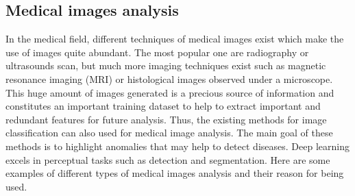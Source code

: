\documentclass[11pt, openany]{report}
\theoremstyle{plain}
\theoremstyle{definition}
\theoremstyle{remark}
\begin{document}
\subsection{Medical images analysis}
In the medical field, different techniques of medical images exist which make the use of images quite abundant. The most popular one are radiography or ultrasounds scan, but much more imaging techniques exist such as magnetic resonance imaging (MRI) or histological images observed under a microscope. This huge amount of images generated is a precious source of information and constitutes an important training dataset to help to extract important and redundant features for future analysis. Thus, the existing methods for image classification can also used for medical image analysis. The main goal of these methods is to highlight anomalies that may help to detect diseases. Deep learning excels in perceptual tasks such as detection and segmentation. Here are some examples of different types of medical images analysis and their reason for being used.
\end{document}
